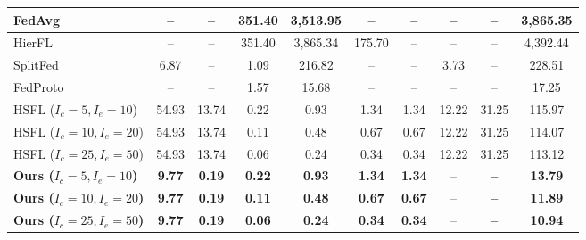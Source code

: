 \begin{table}[!ht]
{\begin{tabular}{l|cccccccc|c}
    \hline
    FedAvg & -- & -- & 351.40 & 3,513.95 & -- & -- & -- & -- & 3,865.35 \\ \hline
    HierFL & -- & -- & 351.40 & 3,865.34 & 175.70 & -- & -- & -- & 4,392.44 \\ \hline
    SplitFed & 6.87 & -- & 1.09 & 216.82 & -- & -- & 3.73 & -- & 228.51 \\ \hline
    FedProto & -- & -- & 1.57 & 15.68 & -- & -- & -- & -- & 17.25 \\ \hline
    HSFL ($I_c=5, I_e=10$) & 54.93 & 13.74 & 0.22 & 0.93 & 1.34 & 1.34 & 12.22 & 31.25 & 115.97 \\
    HSFL ($I_c=10, I_e=20$) & 54.93 & 13.74 & 0.11 & 0.48 & 0.67 & 0.67 & 12.22 & 31.25 & 114.07 \\
    HSFL ($I_c=25, I_e=50$) & 54.93 & 13.74 & 0.06 & 0.24 & 0.34 & 0.34 & 12.22 & 31.25 & 113.12 \\ \hline
    \textbf{Ours ($I_c=5, I_e=10$)} & \textbf{9.77} & \textbf{0.19} & \textbf{0.22} & \textbf{0.93} & \textbf{1.34} & \textbf{1.34} & -- & \textbf{--} & \textbf{13.79} \\
    \textbf{Ours ($I_c=10, I_e=20$)} & \textbf{9.77} & \textbf{0.19} & \textbf{0.11} & \textbf{0.48} & \textbf{0.67} & \textbf{0.67} & -- & \textbf{--} & \textbf{11.89} \\
    \textbf{Ours ($I_c=25, I_e=50$)} & \textbf{9.77} & \textbf{0.19} & \textbf{0.06} & \textbf{0.24} & \textbf{0.34} & \textbf{0.34} & -- & \textbf{--} & \textbf{10.94} \\
    \hline
    \end{tabular}
}
\label{tab:comm_overhead}
\end{table}

